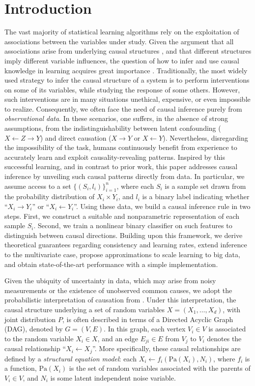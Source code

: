 \documentclass{article}
\begin{document}
\section{Introduction}\label{sec:intro}
The vast majority of statistical learning algorithms rely on the exploitation
of associations between the variables under study. Given the argument that all
associations arise from underlying causal structures \cite{Reichenbach56:Time},
and that different structures imply different variable influences, the question
of how to infer and use causal knowledge in learning acquires great importance
\cite{Pearl00,Scholkopf12}.  Traditionally, the most widely used strategy to
infer the causal structure of a system is to perform interventions on some of
its variables, while studying the response of some others.  However, such
interventions are in many situations unethical, expensive, or even impossible
to realize.  Consequently, we often face the need of causal inference purely
from \emph{observational data}. In these scenarios, one suffers, in the absence
of strong assumptions, from the indistinguishability between
latent confounding ($X \leftarrow Z \rightarrow Y$) and direct causation ($X
\to Y$ or $X \leftarrow Y$).  Nevertheless, disregarding the impossibility of
the task, humans continuously benefit from experience to accurately
learn and exploit causality-revealing patterns.  Inspired by this successful learning, and
in contrast to prior work, this paper addresses causal inference by 
unveiling such causal patterns directly from data. In particular, we assume
access to a set $\{(S_i,l_i)\}_{i=1}^n$, where each $S_i$ is a sample set drawn
from the probability distribution of $X_i \times Y_i$, and $l_i$ is a binary
label indicating whether ``$X_i \to Y_i$'' or ``$X_i \leftarrow Y_i$''.  Using
these data, we build a causal inference rule in two steps.  First, we construct
a suitable and nonparametric representation of each sample $S_i$. Second, we
train a nonlinear binary classifier on such features to distinguish between
causal directions.  Building upon this framework, we derive theoretical
guarantees regarding consistency and learning rates, extend inference to the
multivariate case, propose approximations to scale learning to big data, and
obtain state-of-the-art performance with a simple
implementation.

Given the ubiquity of uncertainty in data, which may arise from noisy
measurements or the existence of unobserved common causes, we adopt the
probabilistic interpretation of causation from \citet{Pearl00}. 
Under this interpretation, the causal structure underlying a set of random
variables $X = (X_1, \ldots, X_d)$, with joint distribution $P$, is often
described in terms of a Directed Acyclic Graph (DAG), denoted by $G = (V,E)$.
In this graph, each vertex $V_i \in V$ is associated to the random variable
$X_i \in X$, and an edge $E_{ji} \in E$ from $V_j$ to $V_i$ denotes 
the causal relationship ``$X_i \leftarrow X_j$''. More specifically, these causal
relationships are defined by a \emph{structural equation model}: each
$X_i \leftarrow f_i(\text{Pa}(X_i), N_i)$, where $f_i$ is a function, $\text{Pa}(X_i)$
is the set of random variables associated with the parents of $V_i \in V$, and
$N_i$ is some latent independent noise variable.
\end{document}
